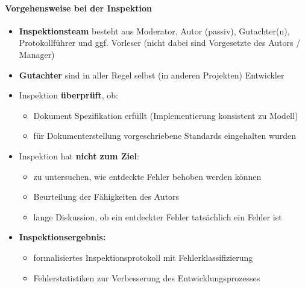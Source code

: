 \paragraph{Vorgehensweise bei der Inspektion}
\begin{itemize}
	\item \textbf{Inspektionsteam} besteht aus Moderator, Autor (passiv), Gutachter(n), Protokollführer und ggf. Vorleser (nicht dabei sind Vorgesetzte des Autors / Manager)
	\item \textbf{Gutachter} sind in aller Regel selbst (in anderen Projekten) Entwickler
	\item Inspektion \textbf{überprüft}, ob:
	\begin{itemize}
		\item Dokument Spezifikation erfüllt (Implementierung konsistent zu Modell)
		\item für Dokumenterstellung vorgeschriebene Standards eingehalten wurden
	\end{itemize}
	\item Inspektion hat \textbf{nicht zum Ziel}:
	\begin{itemize}
		\item zu untersuchen, wie entdeckte Fehler behoben werden können
		\item Beurteilung der Fähigkeiten des Autors
		\item lange Diskussion, ob ein entdeckter Fehler tatsächlich ein Fehler ist
	\end{itemize}
	\item \textbf{Inspektionsergebnis:}
	\begin{itemize}
		\item formalisiertes Inspektionsprotokoll mit Fehlerklassifizierung
		\item Fehlerstatistiken zur Verbesserung des Entwicklungsprozesses
	\end{itemize}
\end{itemize}

